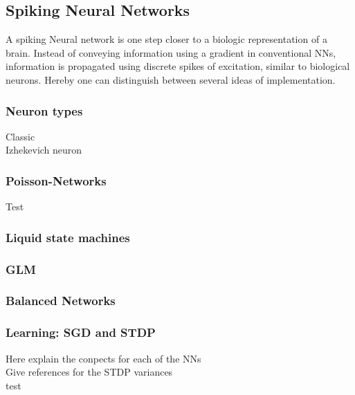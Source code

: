 \subsection{Spiking Neural Networks}
A spiking Neural network is one step closer to a biologic representation of a brain. Instead of conveying information using a gradient in conventional \ac{NN}s, information is propagated using discrete spikes of excitation, similar to biological neurons. Hereby one can distinguish between several ideas of implementation.


\subsubsection{Neuron types}
Classic\\
Izhekevich neuron\\

\subsubsection{Poisson-Networks}
Test
\subsubsection{Liquid state machines}

\subsubsection{GLM}

\subsubsection{Balanced Networks}

\subsubsection{Learning: SGD and STDP}
Here explain the conpects for each of the NNs\\
Give references for the STDP variances\\
test\\
